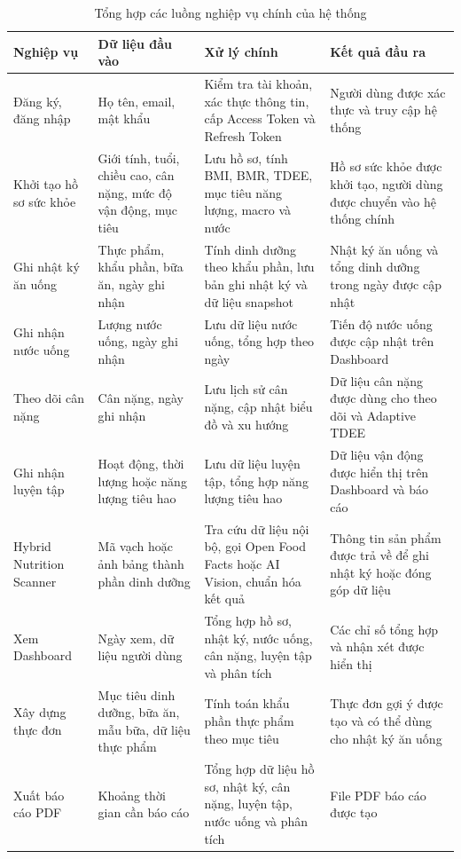 \documentclass[12pt, a4paper]{report}
\begin{document}
\begin{table}[htbp]
\centering
\caption{Tổng hợp các luồng nghiệp vụ chính của hệ thống}
\begin{tabular}{|p{3cm}|p{3cm}|p{4cm}|p{5cm}|}
\hline
\textbf{Nghiệp vụ} & \textbf{Dữ liệu đầu vào} & \textbf{Xử lý chính} & \textbf{Kết quả đầu ra} \\
\hline
Đăng ký, đăng nhập & Họ tên, email, mật khẩu & Kiểm tra tài khoản, xác thực thông tin, cấp Access Token và Refresh Token & Người dùng được xác thực và truy cập hệ thống \\
\hline
Khởi tạo hồ sơ sức khỏe & Giới tính, tuổi, chiều cao, cân nặng, mức độ vận động, mục tiêu & Lưu hồ sơ, tính BMI, BMR, TDEE, mục tiêu năng lượng, macro và nước & Hồ sơ sức khỏe được khởi tạo, người dùng được chuyển vào hệ thống chính \\
\hline
Ghi nhật ký ăn uống & Thực phẩm, khẩu phần, bữa ăn, ngày ghi nhận & Tính dinh dưỡng theo khẩu phần, lưu bản ghi nhật ký và dữ liệu snapshot & Nhật ký ăn uống và tổng dinh dưỡng trong ngày được cập nhật \\
\hline
Ghi nhận nước uống & Lượng nước uống, ngày ghi nhận & Lưu dữ liệu nước uống, tổng hợp theo ngày & Tiến độ nước uống được cập nhật trên Dashboard \\
\hline
Theo dõi cân nặng & Cân nặng, ngày ghi nhận & Lưu lịch sử cân nặng, cập nhật biểu đồ và xu hướng & Dữ liệu cân nặng được dùng cho theo dõi và Adaptive TDEE \\
\hline
Ghi nhận luyện tập & Hoạt động, thời lượng hoặc năng lượng tiêu hao & Lưu dữ liệu luyện tập, tổng hợp năng lượng tiêu hao & Dữ liệu vận động được hiển thị trên Dashboard và báo cáo \\
\hline
Hybrid Nutrition Scanner & Mã vạch hoặc ảnh bảng thành phần dinh dưỡng & Tra cứu dữ liệu nội bộ, gọi Open Food Facts hoặc AI Vision, chuẩn hóa kết quả & Thông tin sản phẩm được trả về để ghi nhật ký hoặc đóng góp dữ liệu \\
\hline
Xem Dashboard & Ngày xem, dữ liệu người dùng & Tổng hợp hồ sơ, nhật ký, nước uống, cân nặng, luyện tập và phân tích & Các chỉ số tổng hợp và nhận xét được hiển thị \\
\hline
Xây dựng thực đơn & Mục tiêu dinh dưỡng, bữa ăn, mẫu bữa, dữ liệu thực phẩm & Tính toán khẩu phần thực phẩm theo mục tiêu & Thực đơn gợi ý được tạo và có thể dùng cho nhật ký ăn uống \\
\hline
Xuất báo cáo PDF & Khoảng thời gian cần báo cáo & Tổng hợp dữ liệu hồ sơ, nhật ký, cân nặng, luyện tập, nước uống và phân tích & File PDF báo cáo được tạo \\
\hline
\end{tabular}
\end{table}
\end{document}
